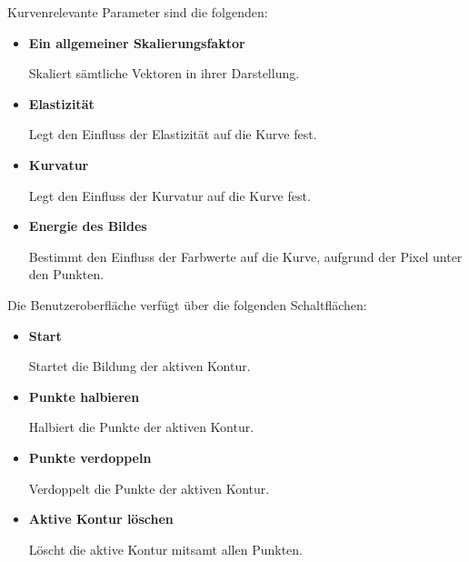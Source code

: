 Kurvenrelevante Parameter sind die folgenden:
\begin{itemize}
    \item \textbf{Ein allgemeiner Skalierungsfaktor}

        Skaliert sämtliche Vektoren in ihrer Darstellung.

    \item \textbf{Elastizität}

        Legt den Einfluss der Elastizität auf die Kurve fest.

    \item \textbf{Kurvatur}

        Legt den Einfluss der Kurvatur auf die Kurve fest.

    \item \textbf{Energie des Bildes}

        Bestimmt den Einfluss der Farbwerte auf die Kurve, aufgrund der Pixel unter den Punkten.
\end{itemize}

\newpage

Die Benutzeroberfläche verfügt über die folgenden Schaltflächen:
\begin{itemize}
    \item \textbf{Start}

        Startet die Bildung der aktiven Kontur.

    \item \textbf{Punkte halbieren}

        Halbiert die Punkte der aktiven Kontur.

    \item \textbf{Punkte verdoppeln}

        Verdoppelt die Punkte der aktiven Kontur.

    \item \textbf{Aktive Kontur löschen}

        Löscht die aktive Kontur mitsamt allen Punkten.
\end{itemize}

